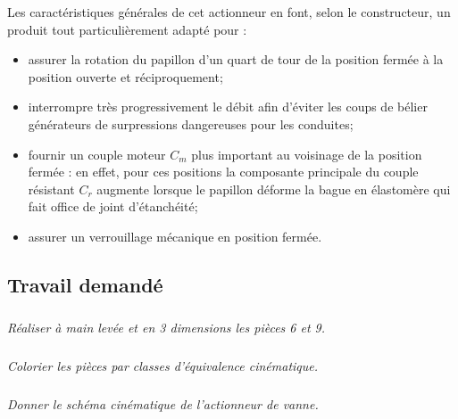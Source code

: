\documentclass[10pt,fleqn]{article} %
\begin{document}
\begin{multicols}{2}
Les caractéristiques générales de cet actionneur en font, selon le constructeur, un produit tout particulièrement adapté pour :
\begin{itemize}
\item assurer la rotation du papillon d’un quart de tour de la position fermée à la position ouverte et réciproquement; 
\item interrompre très progressivement le débit afin d’éviter les coups de bélier générateurs de surpressions dangereuses pour les conduites;
\item fournir un couple moteur $C_m$ plus important au voisinage de la  position fermée : en effet, pour ces positions la composante principale du couple résistant $C_r$ augmente lorsque le papillon déforme la bague en  élastomère qui fait office de joint d’étanchéité;
\item assurer un verrouillage mécanique en position fermée.
\end{itemize}



\subsection*{Travail demandé}
\subparagraph{}
\textit{Réaliser à main levée et en 3 dimensions les pièces 6 et 9.}

\subparagraph{}
\textit{Colorier les pièces par classes d'équivalence cinématique.}


\subparagraph{}
\textit{Donner le schéma cinématique de l'actionneur de vanne.}
\end{multicols}
\end{document}
